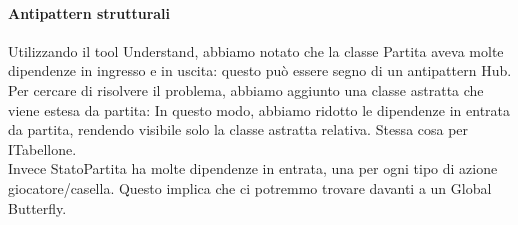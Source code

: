 \documentclass{article}
\begin{document}
\paragraph{Antipattern strutturali}
Utilizzando il tool Understand, abbiamo notato che la classe Partita aveva molte dipendenze in ingresso e in uscita: questo può essere segno di un antipattern Hub. Per cercare di risolvere il problema, abbiamo aggiunto una classe astratta che viene estesa da partita: In questo modo, abbiamo ridotto le dipendenze in entrata da partita, rendendo visibile solo la classe astratta relativa. Stessa cosa per ITabellone.
\\Invece StatoPartita ha molte dipendenze in entrata, una per ogni tipo di azione 
giocatore/casella. Questo implica che ci potremmo trovare davanti a un Global Butterfly.

\paragraph{}
\end{document}
